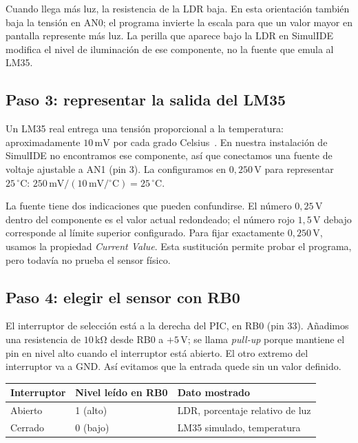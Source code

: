 \documentclass[11pt,a4paper]{article}
\begin{document}
Cuando llega más luz, la resistencia de la LDR baja. En esta orientación también baja la tensión en AN0; el programa invierte la escala para que un valor mayor en pantalla represente más luz. La perilla que aparece bajo la LDR en SimulIDE modifica el nivel de iluminación de ese componente, no la fuente que emula al LM35.

\subsection{Paso 3: representar la salida del LM35}

Un LM35 real entrega una tensión proporcional a la temperatura: aproximadamente \(10\,\mathrm{mV}\) por cada grado Celsius~\cite{lm35}. En nuestra instalación de SimulIDE no encontramos ese componente, así que conectamos una fuente de voltaje ajustable a AN1 (pin 3). La configuramos en \(0{,}250\,\mathrm V\) para representar \(25\,{}^\circ\mathrm C\): \(250\,\mathrm{mV}/(10\,\mathrm{mV}/{}^\circ\mathrm C)=25\,{}^\circ\mathrm C\).

La fuente tiene dos indicaciones que pueden confundirse. El número \(0{,}25\,\mathrm V\) dentro del componente es el valor actual redondeado; el número rojo \(1{,}5\,\mathrm V\) debajo corresponde al límite superior configurado. Para fijar exactamente \(0{,}250\,\mathrm V\), usamos la propiedad \emph{Current Value}. Esta sustitución permite probar el programa, pero todavía no prueba el sensor físico.

\subsection{Paso 4: elegir el sensor con RB0}

El interruptor de selección está a la derecha del PIC, en RB0 (pin 33). Añadimos una resistencia de \(10\,\mathrm{k\Omega}\) desde RB0 a \(+5\,\mathrm V\); se llama \emph{pull-up} porque mantiene el pin en nivel alto cuando el interruptor está abierto. El otro extremo del interruptor va a GND. Así evitamos que la entrada quede sin un valor definido.

\begin{center}
\small
\begin{tabular}{@{}lll@{}}
\toprule
Interruptor & Nivel leído en RB0 & Dato mostrado \\
\midrule
Abierto & 1 (alto) & LDR, porcentaje relativo de luz \\
Cerrado & 0 (bajo) & LM35 simulado, temperatura \\
\bottomrule
\end{tabular}
\end{center}
\end{document}
